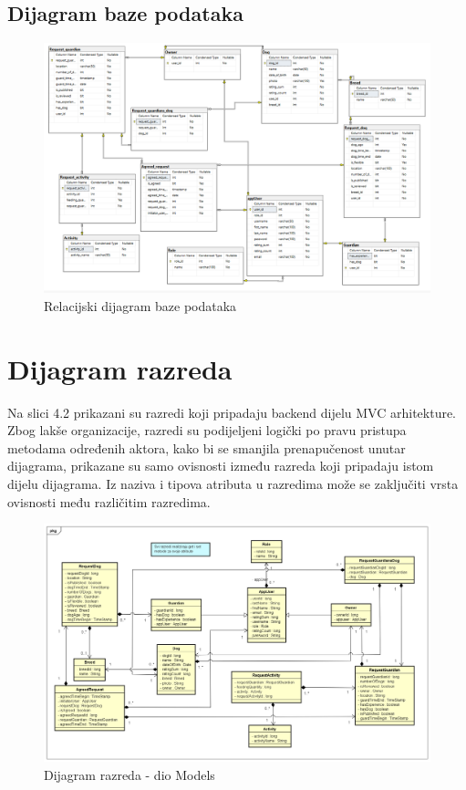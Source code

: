 			
			
		\eject
			\subsection{Dijagram baze podataka}
			
			\begin{figure}[htb]
				\centering
				\includegraphics[width=16cm]{slike/dijagramASCP}
				\caption{Relacijski dijagram baze podataka} 
				\label{fig:E-Rdijagram}
			\end{figure}
			
			\eject
			
			
		\section{Dijagram razreda}
		
			Na slici 4.2 prikazani su razredi koji pripadaju backend dijelu MVC arhitekture.  Zbog lakše organizacije, razredi su podijeljeni logički po pravu pristupa metodama određenih aktora, kako bi se smanjila prenapučenost unutar dijagrama, prikazane su samo ovisnosti između razreda koji pripadaju istom dijelu dijagrama. Iz naziva i tipova atributa u razredima može se zaključiti vrsta ovisnosti među različitim razredima.
			
			\begin{figure}[htb]
				\centering
				\includegraphics[width=16cm]{slike/Class Diagram}
				\caption{Dijagram razreda - dio Models} 
				\label{fig:Class-Diagram}
			\end{figure}
		
